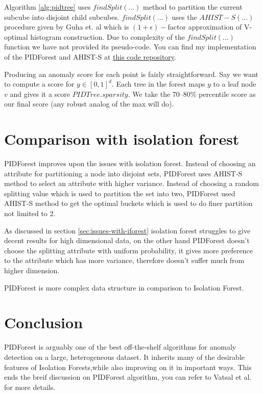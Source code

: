 \pagebreak

Algorithm \ref{alg:pidtree} uses $findSplit(...)$ method to partition the current subcube into disjoint child subcubes.
$findSplit(...)$ uses the $AHIST-S(...)$ procedure given by Guha et. al \cite{10.1145/1132863.1132873} which is $(1+\epsilon)-$factor approximation of V-optimal histogram construction.
Due to complexity of the $findSplit(...)$ function we have not provided its pseudo-code.
You can find my implementation of the PIDForest and AHIST-S at \href{https://github.com/KishoreKaushal/AnomalyDetection/tree/master/pidforest}{this code repository}.

Producing an anomaly score for each point is fairly straightforward.
Say we want to compute a score for $y \in [0, 1]^d$.
Each tree in the forest maps $y$ to a leaf node $v$ and gives it a score $PIDTree.sparsity$.
We take the 70--80\% percentile score as our final score (any robust analog of the max will do).


\section{Comparison with isolation forest}
\label{sec:comparison-with-isolation-forest}

PIDForest improves upon the issues with isolation forest.
Instead of choosing an attribute for partitioning a node into disjoint sets, PIDForest uses AHIST-S method to select an attribute with higher variance.
Instead of choosing a random splitting value which is used to partition the set into two, PIDForest used AHIST-S method to get the optimal buckets which is used to do finer partition not limited to 2.

As discussed in section \ref{sec:issues-with-iforest} isolation forest struggles to give decent results for high dimensional data, on the other hand PIDForest doesn't choose the splitting attribute with uniform probability, it gives more preference to the attribute which has more variance, therefore doesn't suffer much from higher dimension.

PIDForest is more complex data structure in comparison to Isolation Forest.

\section{Conclusion}
\label{sec:pidforest-conclusion}

PIDForest is arguably one of the best off-the-shelf algorithms for anomaly detection on a large, heterogeneous dataset.
It inherits many of the desirable features of Isolation Forests,while also improving on it in important ways.
This ends the breif discussion on PIDForest algorithm, you can refer to Vatsal et al. \cite{NIPS2019_9710} for more details.


